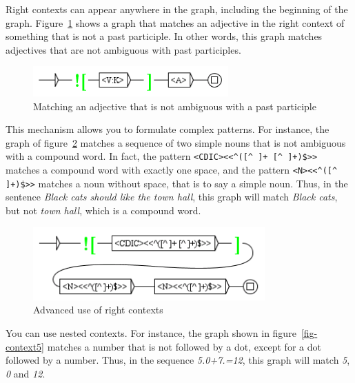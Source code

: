 \bigskip
\noindent Right contexts can appear anywhere in the graph, including the
beginning of the graph. Figure~\ref{fig-context3} shows a graph that matches an
adjective in the right context of something that is not a past participle. In other words, this
graph matches adjectives that are not ambiguous with past participles.

\bigskip
\begin{figure}[!h]
\begin{center}
\includegraphics[width=7.5cm]{resources/img/fig6-14.png}
\caption{Matching an adjective that is not ambiguous with a past
participle\label{fig-context3}}
\end{center}
\end{figure}

\bigskip
\noindent This mechanism allows you to formulate complex patterns. For
instance, the graph of figure~\ref{fig-context4} matches a sequence of two 
simple nouns that is not ambiguous with a compound word. In fact, the 
pattern \verb?<CDIC><<^([^ ]+ [^ ]+)$>>? 
matches a compound word with exactly one space, and the pattern 
\verb?<N><<^([^ ]+)$>>? matches a noun without space, that is to say a simple 
noun. Thus, in the sentence \textit{Black cats should like the town hall}, 
this graph will match \textit{Black cats}, but not \textit{town hall}, which is
a compound word.

\bigskip
\begin{figure}[!h]
\begin{center}
\includegraphics[width=8.9cm]{resources/img/fig6-15.png}
\caption{Advanced use of right contexts\label{fig-context4}}
\end{center}
\end{figure}

\bigskip
\noindent You can use nested contexts. For instance, the graph shown in
figure~\ref{fig-context5} matches a number that is not followed by a dot, except
for a dot followed by a number. Thus, in the sequence \textit{5.0+7.=12}, this graph
will match \textit{5}, \textit{0} and \textit{12}.

